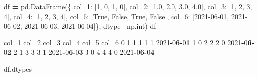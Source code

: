 \documentclass[
]{book}
\newenvironment{Shaded}{\begin{snugshade}}{\end{snugshade}}
\newcommand{\BuiltInTok}[1]{#1}
\newcommand{\DecValTok}[1]{\textcolor[rgb]{0.00,0.00,0.81}{#1}}
\newcommand{\ErrorTok}[1]{\textcolor[rgb]{0.64,0.00,0.00}{\textbf{#1}}}
\newcommand{\FloatTok}[1]{\textcolor[rgb]{0.00,0.00,0.81}{#1}}
\newcommand{\NormalTok}[1]{#1}
\newcommand{\OperatorTok}[1]{\textcolor[rgb]{0.81,0.36,0.00}{\textbf{#1}}}
\newcommand{\StringTok}[1]{\textcolor[rgb]{0.31,0.60,0.02}{#1}}
\newcommand{\VariableTok}[1]{\textcolor[rgb]{0.00,0.00,0.00}{#1}}
\begin{document}
\begin{Shaded}
\begin{Highlighting}[]
\NormalTok{df }\OperatorTok{=}\NormalTok{ pd.DataFrame(\{}
                   \StringTok{\textquotesingle{}col\_1\textquotesingle{}}\NormalTok{: [}\DecValTok{1}\NormalTok{, }\DecValTok{0}\NormalTok{, }\DecValTok{1}\NormalTok{, }\DecValTok{0}\NormalTok{], }
                   \StringTok{\textquotesingle{}col\_2\textquotesingle{}}\NormalTok{: [}\FloatTok{1.0}\NormalTok{, }\FloatTok{2.0}\NormalTok{, }\FloatTok{3.0}\NormalTok{, }\FloatTok{4.0}\NormalTok{], }
                   \StringTok{\textquotesingle{}col\_3\textquotesingle{}}\NormalTok{: [}\StringTok{\textquotesingle{}1\textquotesingle{}}\NormalTok{, }\StringTok{\textquotesingle{}2\textquotesingle{}}\NormalTok{, }\StringTok{\textquotesingle{}3\textquotesingle{}}\NormalTok{, }\StringTok{\textquotesingle{}4\textquotesingle{}}\NormalTok{],}
                   \StringTok{\textquotesingle{}col\_4\textquotesingle{}}\NormalTok{: [}\StringTok{\textquotesingle{}1\textquotesingle{}}\NormalTok{, }\DecValTok{2}\NormalTok{, }\StringTok{\textquotesingle{}3\textquotesingle{}}\NormalTok{, }\DecValTok{4}\NormalTok{],}
                   \StringTok{\textquotesingle{}col\_5\textquotesingle{}}\NormalTok{: [}\VariableTok{True}\NormalTok{, }\VariableTok{False}\NormalTok{, }\VariableTok{True}\NormalTok{, }\VariableTok{False}\NormalTok{],}
                   \StringTok{\textquotesingle{}col\_6\textquotesingle{}}\NormalTok{: [}\StringTok{\textquotesingle{}2021{-}06{-}01\textquotesingle{}}\NormalTok{, }\StringTok{\textquotesingle{}2021{-}06{-}02\textquotesingle{}}\NormalTok{, }\StringTok{\textquotesingle{}2021{-}06{-}03\textquotesingle{}}\NormalTok{, }\StringTok{\textquotesingle{}2021{-}06{-}04\textquotesingle{}}\NormalTok{]\},}
\NormalTok{                   dtype}\OperatorTok{=}\NormalTok{np.}\BuiltInTok{int}\NormalTok{)}
\NormalTok{df}
\end{Highlighting}
\end{Shaded}

\begin{Shaded}
\begin{Highlighting}[]
\NormalTok{   col\_1  col\_2  col\_3  col\_4  col\_5       col\_6}
\DecValTok{0}      \DecValTok{1}      \DecValTok{1}      \DecValTok{1}      \DecValTok{1}      \DecValTok{1}  \DecValTok{2021}\OperatorTok{{-}}\DecValTok{0}\ErrorTok{6}\OperatorTok{{-}}\DecValTok{0}\ErrorTok{1}
\DecValTok{1}      \DecValTok{0}      \DecValTok{2}      \DecValTok{2}      \DecValTok{2}      \DecValTok{0}  \DecValTok{2021}\OperatorTok{{-}}\DecValTok{0}\ErrorTok{6}\OperatorTok{{-}}\DecValTok{0}\ErrorTok{2}
\DecValTok{2}      \DecValTok{1}      \DecValTok{3}      \DecValTok{3}      \DecValTok{3}      \DecValTok{1}  \DecValTok{2021}\OperatorTok{{-}}\DecValTok{0}\ErrorTok{6}\OperatorTok{{-}}\DecValTok{0}\ErrorTok{3}
\DecValTok{3}      \DecValTok{0}      \DecValTok{4}      \DecValTok{4}      \DecValTok{4}      \DecValTok{0}  \DecValTok{2021}\OperatorTok{{-}}\DecValTok{0}\ErrorTok{6}\OperatorTok{{-}}\DecValTok{0}\ErrorTok{4}

\NormalTok{df.dtypes}
\end{Highlighting}
\end{Shaded}
\end{document}
